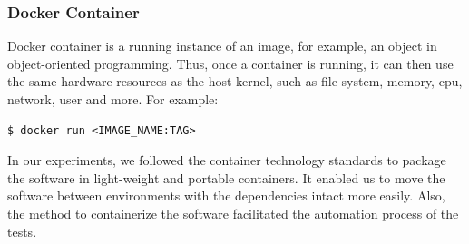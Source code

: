 \clearpage
\subsubsection{Docker Container}
Docker container is a running instance of an image, for example, an object in object-oriented programming.
Thus, once a container is running, it can then use the same hardware resources as the host kernel, such as file system, memory, \acrshort{cpu}, network, user and more.
For example:
\begin{lstlisting}[numbers=none, frame=single]
  $ docker run <IMAGE_NAME:TAG>
\end{lstlisting}

\skippara In our experiments, we followed the container technology standards to package the software in light-weight and portable containers.
It enabled us to move the software between environments with the dependencies intact more easily.
Also, the method to containerize the software facilitated the automation process of the tests.
